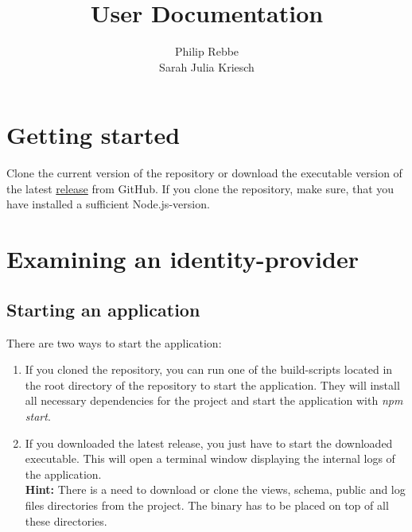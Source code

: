 \documentclass[english, letterpaper, 10 pt]{report}
\begin{document}
\title{User Documentation}
\author{Philip Rebbe \\
Sarah Julia Kriesch}
\maketitle
\pagestyle{empty}


\newpage
\section*{Getting started}

Clone the current version of the repository or download the executable version of the latest \href{https://github.com/amosproj/amos2022ss08-openid-connect-doctor/releases}{release} from GitHub. If you clone the repository, make sure, that you have installed a sufficient Node.js-version.


\section*{Examining an identity-provider}

\subsection* {Starting an application}

There are two ways to start the application:

\begin{enumerate}
\item If you cloned the repository, you can run one of the build-scripts located in the root directory of the repository to start the application. They will install all necessary dependencies for the project and start the application with \textit{npm start}. 
\item If you downloaded the latest release, you just have to start the downloaded executable. This will open a terminal window displaying the internal logs of the application. \\ \textbf{Hint:} There is a need to download or clone the views, schema, public and log files directories from the project. The binary has to be placed on top of all these directories.
\end{enumerate}    
\end{document}
